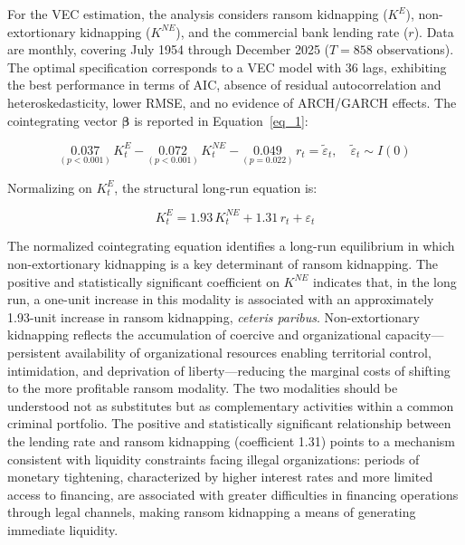 \documentclass[12pt,a4paper]{article}
\theoremstyle{plain}
\theoremstyle{definition}
\theoremstyle{remark}
\newcommand{\1}{\mathbf{1}}
\begin{document}
For the VEC estimation, the analysis considers ransom kidnapping ($K^{E}$),
non-extortionary kidnapping ($K^{NE}$), and the commercial bank lending rate ($r$).
Data are monthly, covering July 1954 through December 2025 ($T=858$ observations).
The optimal specification corresponds to a VEC model with 36 lags, exhibiting the
best performance in terms of AIC, absence of residual autocorrelation and
heteroskedasticity, lower RMSE, and no evidence of ARCH/GARCH effects. The
cointegrating vector $\boldsymbol{\beta}$ is reported in Equation~\ref{eq_1}:

\begin{equation}
\label{eq_1}
    \underset{(p < 0.001)}{0.037}\,K^{E}_t
    - \underset{(p < 0.001)}{0.072}\,K^{NE}_t
    - \underset{(p = 0.022)}{0.049}\,r_t = \tilde{\varepsilon}_t,
    \quad \tilde{\varepsilon}_t \sim I(0)
\end{equation}

Normalizing on $K^{E}_t$, the structural long-run equation is:

\begin{center}
\begin{minipage}{0.50\linewidth}
\begin{equation}
\label{eq_2}
  K^{E}_t = 1.93\,K^{NE}_t + 1.31\,r_t + \varepsilon_t
\end{equation}
\end{minipage}
\end{center}

The normalized cointegrating equation identifies a long-run equilibrium in which
non-extortionary kidnapping is a key determinant of ransom kidnapping. The positive
and statistically significant coefficient on $K^{NE}$ indicates that, in the long run,
a one-unit increase in this modality is associated with an approximately 1.93-unit
increase in ransom kidnapping, \textit{ceteris paribus}. Non-extortionary kidnapping
reflects the accumulation of coercive and organizational capacity---persistent
availability of organizational resources enabling territorial control, intimidation,
and deprivation of liberty---reducing the marginal costs of shifting to the more
profitable ransom modality. The two modalities should be understood not as substitutes
but as complementary activities within a common criminal portfolio. The positive and
statistically significant relationship between the lending rate and ransom kidnapping
(coefficient 1.31) points to a mechanism consistent with liquidity constraints facing
illegal organizations: periods of monetary tightening, characterized by higher interest
rates and more limited access to financing, are associated with greater difficulties
in financing operations through legal channels, making ransom kidnapping a means of
generating immediate liquidity.
\end{document}
